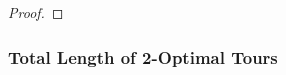 \documentclass[11pt,DIV=12,a4paper]{scrartcl}
\newcommand{\TSP}{\mathsf{TSP}}
\newcommand{\OPT}{\mathrm{OPT}}
\begin{document}
\begin{proof}
\end{proof}


\subsubsection{Total Length of 2-Optimal Tours}
\end{document}

